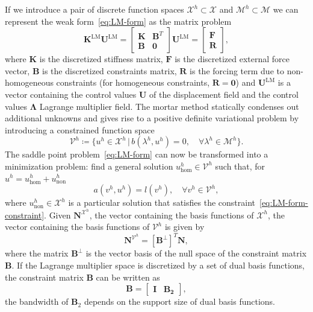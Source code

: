 If we introduce a pair of discrete function spaces $\mathcal{X}^h \subset \mathcal{X}$ and $\mathcal{M}^h \subset \mathcal{M}$ we can represent the weak form~\eqref{eq:LM-form} as the matrix problem
\begin{equation}\label{eq:disc-LM-form}
	\mathbf{K}^\text{LM}\mathbf{U}^{\text{LM}}=\begin{bmatrix}
		\mathbf{K} & \mathbf{B}^T \\
		\mathbf{B} & \mathbf{0}
	\end{bmatrix}\mathbf{U}^{\text{LM}}
	=
	\begin{bmatrix}
		\mathbf{F} \\
		\mathbf{R}
	\end{bmatrix},
\end{equation}
where $\mathbf{K}$ is the discretized stiffness matrix, $\mathbf{F}$ is the discretized external force vector, $\mathbf{B}$ is the discretized constraints matrix, $\mathbf{R}$ is the forcing term due to non-homogeneous constraints (for homogeneous constraints, $\mathbf{R} = \mathbf{0}$) and $\mathbf{U}^{\text{LM}}$ is a vector containing the control values $\mathbf{U}$ of the displacement field and the control values $\mathbf{\Lambda}$ Lagrange multiplier field. The mortar method statically condenses out additional unknowns and gives rise to a positive definite variational problem by introducing a constrained function space
\begin{equation}
	\mathcal{V}^h\coloneq\{u^h\in\mathcal{X}^h\, | \, b(\lambda^h,u^h)=0, \quad \forall{}\lambda^h\in\mathcal{M}^h\}.
\end{equation}
The saddle point problem~\eqref{eq:LM-form} can now be transformed into a minimization problem: find a general solution $u^h_\text{hom}\in\mathcal{V}^h$ such that, for $u^h = u^h_\text{hom}+ u^h_\text{non}$
\begin{equation}
	a(v^h, u^h)=l(v^h),\quad \forall{}v^h\in\mathcal{V}^h,
\end{equation}
where $u^h_\text{non}\in \mathcal{X}^h$ is a particular solution that satisfies the constraint~\eqref{eq:LM-form-constraint}. Given $\mathbf{N}^{\mathcal{X}^h}$, the vector containing the basis functions of $\mathcal{X}^h$, the vector containing the basis functions of $\mathcal{V}^h$ is given by
\begin{equation}
	\mathbf{N}^{\mathcal{V}^h}=\left[\mathbf{B}^\perp\right]^T\mathbf{N},\label{eq:basis-null-space}
\end{equation}
where the matrix $\mathbf{B}^\perp$ is the vector basis of the null space of the constraint matrix $\mathbf{B}$. If the Lagrange multiplier space is discretized by a set of dual basis functions, the constraint matrix $\mathbf{B}$ can be written as~\cite{gilbert1987computing}
\begin{equation}\label{eq:constraint-form}
	\mathbf{B}=\begin{bmatrix}
		\mathbf{I} & \mathbf{B_2}
	\end{bmatrix},
\end{equation}
the bandwidth of $\mathbf{B}_2$ depends on the support size of dual basis functions. \par

